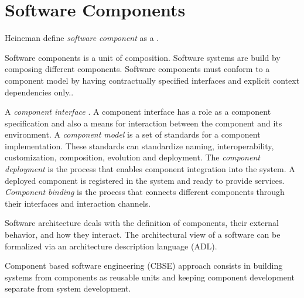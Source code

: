 \section{Software Components}
Heineman define \emph{software component} as a
\cite{heineman_component-based_2001}.

Software components is a unit of composition. Software systems are build by composing different components.  Software components must conform to a component model by having contractually specified interfaces and explicit context dependencies only.\cite{szyperski_component_2002}.

A \emph{component	interface} \cite{crnkovic_software_2011}.
A component interface has a role as a component specification and also a means for interaction between the component and its environment.
A \emph{component model} is a set of standards for a component implementation. These standards can standardize naming, interoperability, customization, composition, evolution and deployment.\cite{heineman_component-based_2001}
The \emph{component deployment} is the process that enables component integration into the system. A deployed component is registered in the system and ready to provide services\cite{crnkovic_software_2011}.
\emph{Component binding} is the process that connects different components through their interfaces and interaction channels.

Software architecture deals with the definition of components, their external behavior, and how they interact\cite{kaur_component_2010}. The architectural view of a software can be formalized via an architecture description language (ADL)\cite{medvidovic_classification_2000}.


Component based software engineering (CBSE) approach consists in building systems from components as reusable units and keeping component development separate from system development\cite{crnkovic_software_2011}.

